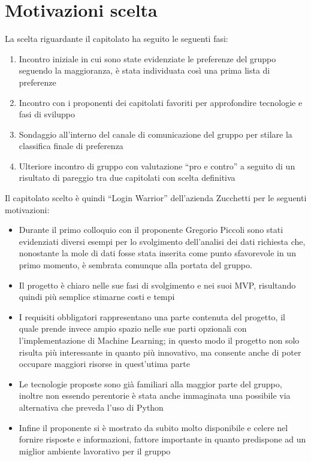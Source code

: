 \section{Motivazioni scelta}
La scelta riguardante il capitolato ha seguito le seguenti fasi:
\begin{enumerate}
	\item Incontro iniziale in cui sono state evidenziate le preferenze del gruppo seguendo la maggioranza, è stata individuata così una prima lista di preferenze
	\item Incontro con i proponenti dei capitolati favoriti per approfondire tecnologie e fasi di sviluppo
	\item Sondaggio all'interno del canale di comunicazione del gruppo per stilare la classifica finale di preferenza
	\item Ulteriore incontro di gruppo con valutazione ``pro e contro'' a seguito di un risultato di pareggio tra due capitolati con scelta definitiva
\end{enumerate}
Il capitolato scelto è quindi ``Login Warrior'' dell'azienda Zucchetti per le seguenti motivazioni:
\begin{itemize}
	\item Durante il primo colloquio con il proponente Gregorio Piccoli sono stati evidenziati diversi esempi per lo svolgimento dell'analisi dei dati richiesta che, nonostante la mole di dati fosse stata inserita come punto sfavorevole in un primo momento, è sembrata comunque alla portata del gruppo.
	\item Il progetto è chiaro nelle sue fasi di svolgimento e nei suoi MVP, risultando quindi più semplice stimarne costi e tempi
	\item I requisiti obbligatori rappresentano una parte contenuta del progetto, il quale prende invece ampio spazio nelle sue parti opzionali con l'implementazione di Machine Learning; in questo modo il progetto non solo risulta più interessante in quanto più innovativo, ma consente anche di poter occupare maggiori risorse in quest'utima parte
	\item Le tecnologie proposte sono già familiari alla maggior parte del gruppo, inoltre non essendo perentorie è stata anche immaginata una possibile via alternativa che preveda l'uso di Python
	\item Infine il proponente si è mostrato da subito molto disponibile e celere nel fornire risposte e informazioni, fattore importante in quanto predispone ad un miglior ambiente lavorativo per il gruppo
\end{itemize}